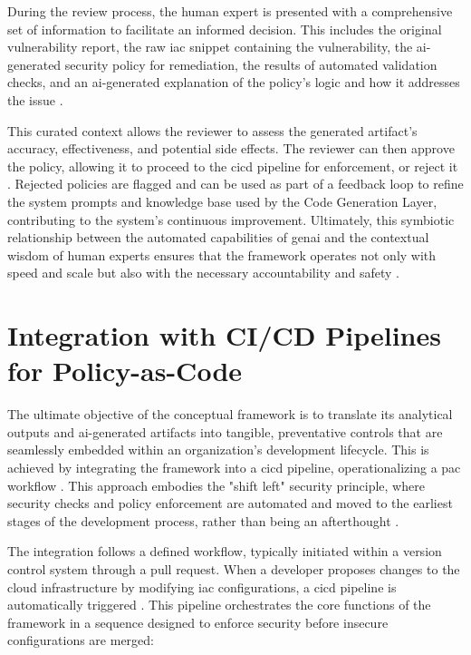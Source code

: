 During the review process, the human expert is presented with a comprehensive set of information to facilitate an informed decision. This includes the original vulnerability report, the raw \gls{iac} snippet containing the vulnerability, the \gls{ai}-generated security policy for remediation, the results of automated validation checks, and an \gls{ai}-generated explanation of the policy’s logic and how it addresses the issue .

This curated context allows the reviewer to assess the generated artifact's accuracy, effectiveness, and potential side effects. The reviewer can then approve the policy, allowing it to proceed to the \gls{cicd} pipeline for enforcement, or reject it \cite{noauthor_human---loop_nodate}. Rejected policies are flagged and can be used as part of a feedback loop to refine the system prompts and knowledge base used by the Code Generation Layer, contributing to the system's continuous improvement. Ultimately, this symbiotic relationship between the automated capabilities of \gls{genai} and the contextual wisdom of human experts ensures that the framework operates not only with speed and scale but also with the necessary accountability and safety  \cite{noauthor_human---loop_nodate}.


\section{Integration with CI/CD Pipelines for Policy-as-Code} %
\label{sec:Integration with CI/CD Pipelines for Policy-as-Code}

The ultimate objective of the conceptual framework is to translate its analytical outputs and \gls{ai}-generated artifacts into tangible, preventative controls that are seamlessly embedded within an organization's development lifecycle. This is achieved by integrating the framework into a \gls{cicd} pipeline, operationalizing a \gls{pac} workflow \cite{sarathe_krisshnan_jutoo_vijayaraghavan_policy_2025}. This approach embodies the "shift left" security principle, where security checks and policy enforcement are automated and moved to the earliest stages of the development process, rather than being an afterthought .

The integration follows a defined workflow, typically initiated within a version control system through a pull request. When a developer proposes changes to the cloud infrastructure by modifying \gls{iac} configurations, a \gls{cicd} pipeline is automatically triggered . This pipeline orchestrates the core functions of the framework in a sequence designed to enforce security before insecure configurations are merged:

